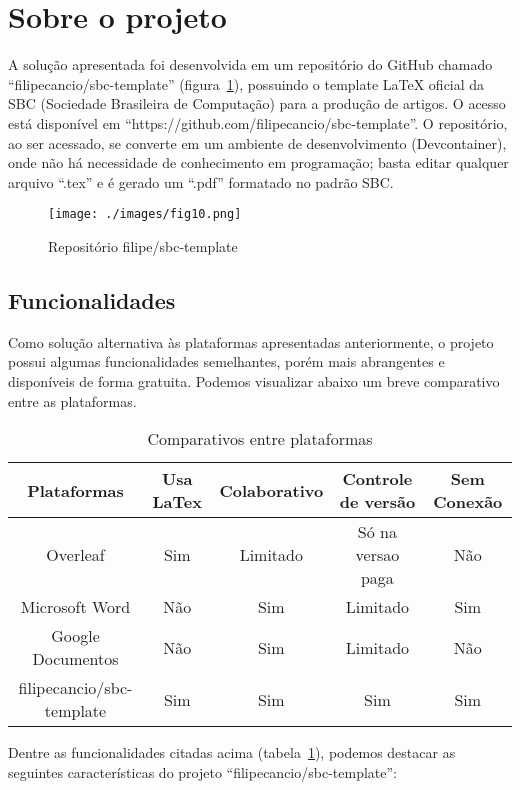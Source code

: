 \section{Sobre o projeto}

A solução apresentada foi desenvolvida em um repositório do GitHub chamado ``filipecancio/sbc-template'' (figura~\ref{fig:fig10}), possuindo o template LaTeX oficial da SBC (Sociedade Brasileira de Computação) para a produção de artigos. O acesso está disponível em ``https://github.com/filipecancio/sbc-template''. O repositório, ao ser acessado, se converte em um ambiente de desenvolvimento (Devcontainer), onde não há necessidade de conhecimento em programação; basta editar qualquer arquivo ``.tex'' e é gerado um ``.pdf'' formatado no padrão SBC.

\begin{figure}[ht]
	\centering
	\texttt{[image: ./images/fig10.png]}
	\caption{Repositório filipe/sbc-template}
	\label{fig:fig10}
\end{figure}

\subsection{Funcionalidades}

Como solução alternativa às plataformas apresentadas anteriormente, o projeto possui algumas funcionalidades semelhantes, porém mais abrangentes e disponíveis de forma gratuita. Podemos visualizar abaixo um breve comparativo entre as plataformas.

\begin{table}[ht]
	\centering
	\begin{tabular}{|c|c|c|c|c|}
		\hline
		Plataformas & Usa LaTex & Colaborativo & Controle de versão & Sem Conexão
		\\
		\hline
		Overleaf & Sim & Limitado & Só na versao paga & Não \\
		\hline
		Microsoft Word & Não & Sim & Limitado & Sim \\
		\hline
		Google Documentos & Não & Sim & Limitado & Não \\
		\hline
		filipecancio/sbc-template & Sim & Sim & Sim & Sim \\
		\hline
	\end{tabular}
	\caption{Comparativos entre plataformas}
	\label{tab:tabela01}
\end{table}

Dentre as funcionalidades citadas acima (tabela~\ref{tab:tabela01}), podemos destacar as seguintes características do projeto ``filipecancio/sbc-template'':

